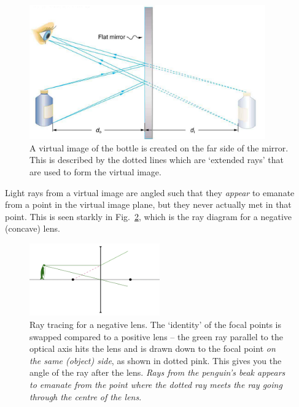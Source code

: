\documentclass[a4paper]{report}
\begin{document}
    \begin{figure}[h]
    \center
    \includegraphics[width=4in]{figures/virtual_image_mirr.jpg}
    \caption{A virtual image of the bottle is created on the far side of the mirror. 
    This is described by the dotted lines which are `extended rays' that are used to form the virtual image. }
    \label{fig:mirror}
    \end{figure}
    
    \clearpage

    Light rays from a virtual image are angled such that they \emph{appear} to emanate from a point in the virtual image plane, but they never actually met in that point.
    This is seen starkly in Fig.~\ref{fig:negative_lens_tracing}, which is the ray diagram for a negative (concave) lens.

    \begin{figure}[h]
		\center
		\includegraphics[width=0.5\textwidth]{figures/negative_lens_tracing.png}
		\captionsetup{width=0.6\textwidth}
		\caption{Ray tracing for a negative lens. The `identity' of the focal points is swapped compared to a positive lens -- the green ray parallel to the optical axis hits the lens and is drawn down to the focal point \emph{on the same (object) side}, as shown in dotted pink. This gives you the angle of the ray after the lens. \emph{Rays from the penguin's beak appears to emanate from the point where the dotted ray meets the ray going through the centre of the lens}.
		}
		\label{fig:negative_lens_tracing}
	\end{figure}
\end{document}
